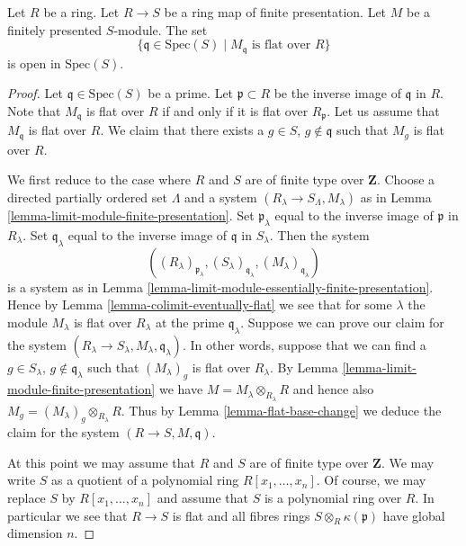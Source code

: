 \begin{theorem}
\label{theorem-openess-flatness}
Let $R$ be a ring. Let $R \to S$ be a ring map of finite
presentation. Let $M$ be a finitely presented $S$-module.
The set
$$
\{ \mathfrak q \in \text{Spec}(S) \mid
M_{\mathfrak q}\text{ is flat over }R\}
$$
is open in $\text{Spec}(S)$.
\end{theorem}

\begin{proof}
Let $\mathfrak q \in \text{Spec}(S)$ be a prime.
Let $\mathfrak p \subset R$ be the inverse image of $\mathfrak q$ in $R$.
Note that $M_{\mathfrak q}$ is flat over $R$ if and only if 
it is flat over $R_{\mathfrak p}$. 
Let us assume that $M_{\mathfrak q}$ is flat over $R$.
We claim that there exists a $g \in S$, $g \not \in \mathfrak q$
such that $M_g$ is flat over $R$.

\medskip\noindent
We first reduce to the case where $R$ and $S$ are
of finite type over $\mathbf{Z}$.
Choose a directed partially ordered set $\Lambda$ and
a system $(R_\lambda \to S_\Lambda, M_\lambda)$
as in Lemma \ref{lemma-limit-module-finite-presentation}.
Set $\mathfrak p_\lambda$ equal to the inverse image of
$\mathfrak p$ in $R_\lambda$. 
Set $\mathfrak q_\lambda$ equal to the inverse image of
$\mathfrak q$ in $S_\lambda$.
Then the system
$$
((R_\lambda)_{\mathfrak p_\lambda},
(S_\lambda)_{\mathfrak q_\lambda},
(M_\lambda)_{\mathfrak q_{\lambda}})
$$
is a system as in 
Lemma \ref{lemma-limit-module-essentially-finite-presentation}.
Hence by Lemma \ref{lemma-colimit-eventually-flat}
we see that for some $\lambda$ the module
$M_\lambda$ is flat over $R_\lambda$ at the prime
$\mathfrak q_{\lambda}$. Suppose we
can prove our claim for the system
$(R_\lambda \to S_\lambda, M_\lambda, \mathfrak q_{\lambda})$.
In other words, suppose that we can find a $g \in S_\lambda$,
$g \not\in \mathfrak q_\lambda$ such that $(M_\lambda)_g$
is flat over $R_\lambda$. By Lemma \ref{lemma-limit-module-finite-presentation}
we have $M = M_\lambda \otimes_{R_\lambda} R$ and hence
also $M_g = (M_\lambda)_g \otimes_{R_\lambda} R$. Thus by
Lemma \ref{lemma-flat-base-change} we deduce the claim
for the system $(R \to S, M, \mathfrak q)$.

\medskip\noindent
At this point we may assume that $R$ and $S$ are of finite type
over $\mathbf{Z}$. We may write $S$ as a quotient of a
polynomial ring $R[x_1,\ldots,x_n]$. Of course, we may replace
$S$ by $R[x_1,\ldots,x_n]$ and assume that $S$ is a polynomial
ring over $R$. In particular we see that $R \to S$ is flat
and all fibres rings $S \otimes_R \kappa(\mathfrak p)$
have global dimension $n$.


\end{proof}
